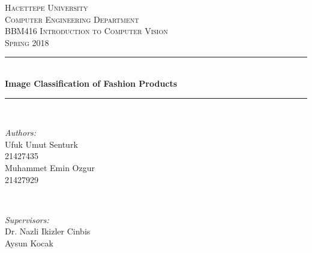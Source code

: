 \begin{titlepage}

\newcommand{\HRule}{\rule{\linewidth}{0.5mm}} %

\center %
 

\textsc{\LARGE Hacettepe University}\\[1.5cm] %
\textsc{\Large Computer Engineering Department}\\[0.5cm] %
\textsc{\large BBM416 Introduction to Computer Vision}\\[0.5cm] %
\textsc{\large Spring 2018}\\[0.5cm]

\HRule \\[0.4cm]
{ \huge \bfseries Image Classification of Fashion Products}\\[0.4cm] %
\HRule \\[1.5cm]
 

\begin{minipage}{0.4\textwidth}
\begin{flushleft} \large
\emph{Authors:}\\
Ufuk Umut Senturk\\21427435 %
\\Muhammet Emin Ozgur\\21427929
\end{flushleft}
\end{minipage}
~
\begin{minipage}{0.4\textwidth}
\begin{flushright} \large
\emph{Supervisors:} \\
Dr. Nazli Ikizler Cinbis\\ %
Aysun Kocak
\end{flushright}
\end{minipage}\\[2cm]


\end{titlepage}
